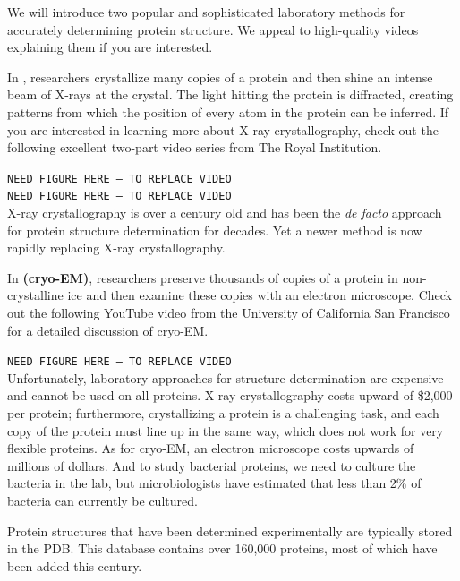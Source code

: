 We will introduce two popular and sophisticated laboratory methods for accurately determining protein structure. We appeal to high-quality videos explaining them if you are interested.

In , researchers crystallize many copies of a protein and then shine an intense beam of X-rays at the crystal. The light hitting the protein is diffracted, creating patterns from which the position of every atom in the protein can be inferred. If you are interested in learning more about X-ray crystallography, check out the following excellent two-part video series from The Royal Institution.

\texttt{NEED FIGURE HERE -- TO REPLACE VIDEO}\\

\texttt{NEED FIGURE HERE -- TO REPLACE VIDEO}\\

X-ray crystallography is over a century old and has been the \textit{de facto} approach for protein structure determination for decades. Yet a newer method is now rapidly replacing X-ray crystallography.

In  \textbf{(cryo-EM)}, researchers preserve thousands of copies of a protein in non-crystalline ice and then examine these copies with an electron microscope. Check out the following YouTube video from the University of California San Francisco for a detailed discussion of cryo-EM.

\texttt{NEED FIGURE HERE -- TO REPLACE VIDEO}\\

Unfortunately, laboratory approaches for structure determination are expensive and cannot be used on all proteins. X-ray crystallography costs upward of \$2,000 per protein; furthermore, crystallizing a protein is a challenging task, and each copy of the protein must line up in the same way, which does not work for very flexible proteins. As for cryo-EM, an electron microscope costs upwards of millions of dollars. And to study bacterial proteins, we need to culture the bacteria in the lab, but microbiologists have estimated that less than 2\% of bacteria can currently be cultured.

Protein structures that have been determined experimentally are typically stored in the PDB. This database contains over 160,000 proteins, most of which have been added this century.

